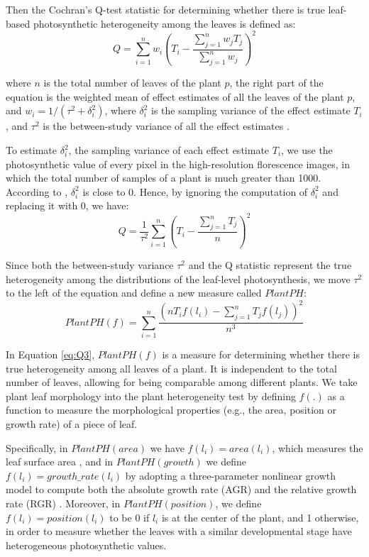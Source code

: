 {Then the Cochran's Q-test statistic for determining whether there is true leaf-based photosynthetic heterogeneity among the leaves is defined as:
%
\begin{equation}\label{eq:Q}
Q=\sum_{i=1}^n w_i\left(T_i-\frac{\sum_{j=1}^n w_jT_j}{\sum_{j=1}^n w_j}\right)^2
\end{equation}

\noindent where $n$ is the total number of leaves of the plant $p$,  the right part of the equation is the weighted mean of effect estimates of all the leaves of the plant $p$, and $w_i=1/(\tau^2+\delta_i^2)$, where $\delta_i^2$ is the sampling variance of the effect estimate $T_i$, and $\tau^2$ is the between-study variance of all the effect estimates \cite{huedo2006assessing}.

To estimate $\delta_i^2$, the sampling variance of each effect estimate $T_i$, we use the photosynthetic value of every pixel in the high-resolution florescence images, in which the total number of samples of a plant is much greater than 1000. According to \cite{huedo2006assessing}, $\delta_i^2$ is close to 0. Hence, by ignoring the computation of  $\delta_i^2$ and replacing it with 0, we have:
%
\begin{equation}\label{eq:Q2}
Q=\frac{1}{\tau^2}\sum_{i=1}^n\left(T_i-\frac{\sum_{j=1}^n T_j}{n}\right)^2
\end{equation}

Since both the between-study variance $\tau^2$ and the Q statistic represent the true heterogeneity among the distributions of the leaf-level photosynthesis, we move $\tau^2$ to the left of the equation and define a new measure called $PlantPH$:
%
\begin{equation}\label{eq:Q3}
PlantPH(f)=\sum_{i=1}^n\frac{\left(nT_if(l_i)-\sum_{j=1}^n T_jf(l_j)\right)^2}{n^3}
\end{equation}

In Equation \ref{eq:Q3}, $PlantPH(f)$ is a measure for determining whether there is true heterogeneity among all leaves of a plant. It is independent to the total number of leaves, allowing for being comparable among different plants. We take plant leaf morphology into the plant heterogeneity test by defining $f(.)$ as a function to measure the morphological properties (e.g., the area, position or growth rate) of a piece of leaf.

Specifically, in $PlantPH(area)$ we have $f(l_i)=area(l_i)$, which measures the leaf surface area \cite{boyes2001growth,tessmer2013functional}, and in $PlantPH(growth)$ we define $f(l_i)=growth\_rate(l_i)$ by adopting a three-parameter nonlinear growth model to compute both the absolute growth rate (AGR) and the relative growth rate (RGR) \cite{Richards1959,hunt1982plant,tessmer2013functional}. Moreover, in $PlantPH(position)$, we define $f(l_i)=position(l_i)$ to be 0 if $l_i$ is at the center of the plant, and 1 otherwise, in order to measure whether the leaves with a similar developmental stage have heterogeneous photosynthetic values.

}
